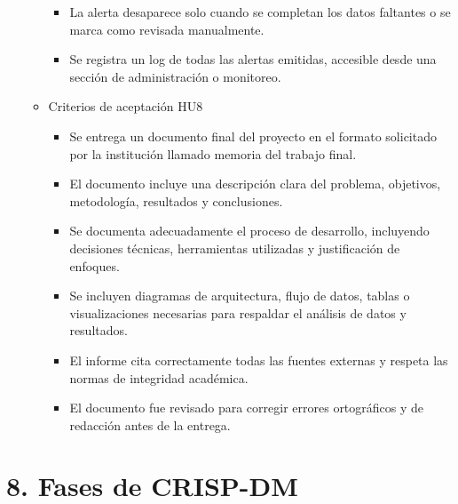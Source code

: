 \documentclass[
11pt, %
]{charter}
\begin{document}
\begin{itemize}
\begin{itemize}
\begin{itemize}
      \item La alerta desaparece solo cuando se completan los datos faltantes o se marca como revisada manualmente.

      \item Se registra un log de todas las alertas emitidas, accesible desde una sección de administración o monitoreo.
          \end{itemize}
          
      \item Criterios de aceptación HU8
      
    \begin{itemize}
      \item Se entrega un documento final del proyecto en el formato solicitado por la institución llamado memoria del trabajo final.

      \item El documento incluye una descripción clara del problema, objetivos, metodología, resultados y conclusiones.

      \item Se documenta adecuadamente el proceso de desarrollo, incluyendo decisiones técnicas, herramientas utilizadas y justificación de enfoques.

      \item Se incluyen diagramas de arquitectura, flujo de datos, tablas o visualizaciones necesarias para respaldar el análisis de datos y resultados.

      \item El informe cita correctamente todas las fuentes externas y respeta las normas de integridad académica.

      \item El documento fue revisado para corregir errores ortográficos y de redacción antes de la entrega.
      
    \end{itemize}      
    \end{itemize}
\end{itemize}


\section{8. Fases de CRISP-DM}
\end{document}
